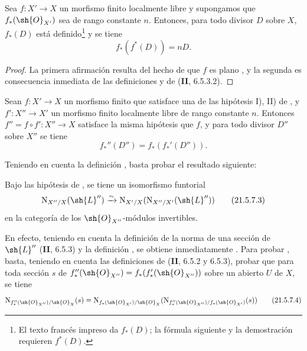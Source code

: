 \begin{proposition}[21.5.6]
\label{IV.21.5.6}
Sea $f:X'\to X$ un morfismo finito localmente libre y supongamos que $f_*(\sh{O}_{X'})$ sea de rango constante $n$.
Entonces, para todo divisor $D$ sobre $X$, $f_*(D)$ está definido\footnote{El texto francés impreso da $f_*(D)$; la fórmula siguiente y la demostración requieren $f^*(D)$.} y se tiene
\[
\label{IV.21.5.6.1}
  f_*(f^*(D))=nD.
  \tag{21.5.6.1}
\]
\end{proposition}

\begin{proof}
La primera afirmación resulta del hecho de que $f$ es plano , y la segunda es consecuencia inmediata de las definiciones y de (\textbf{II}, 6.5.3.2).
\end{proof}

\begin{proposition}[21.5.7]
\label{IV.21.5.7}
Sean $f:X'\to X$ un morfismo finito que satisface una de las hipótesis \textup{I), II)} de , y $f':X''\to X'$ un morfismo finito localmente libre de rango constante $n$.
Entonces $f''=f\circ f':X''\to X$ satisface la misma hipótesis que $f$, y para todo divisor $D''$ sobre $X''$ se tiene
\[
\label{IV.21.5.7.1}
  f_*''(D'')=f_*(f_*'(D'')).
  \tag{21.5.7.1}
\]
\end{proposition}

Teniendo en cuenta la definición , basta probar el resultado siguiente:

\begin{lemma}[21.5.7.2]
\label{IV.21.5.7.2}
Bajo las hipótesis de , se tiene un isomorfismo funtorial
\[
\label{IV.21.5.7.3}
  \mathrm{N}_{X''/X}(\sh{L}'')\xrightarrow{\sim}\mathrm{N}_{X'/X}(\mathrm{N}_{X''/X'}(\sh{L}''))
  \tag{21.5.7.3}
\]
en la categoría de los $\sh{O}_{X''}$-módulos invertibles.
\end{lemma}

En efecto, teniendo en cuenta la definición de la norma de una sección de $\sh{L}''$ (\textbf{II}, 6.5.3) y la definición , se obtiene inmediatamente .
Para probar , basta, teniendo en cuenta las definiciones de (\textbf{II}, 6.5.2 y 6.5.3), probar que para toda sección $s$ de $f_*''(\sh{O}_{X''})=f_*(f_*'(\sh{O}_{X''}))$ sobre un abierto $U$ de $X$, se tiene
\[
\label{IV.21.5.7.4}
  \mathrm{N}_{f_*''(\sh{O}_{X''})/\sh{O}_X}(s)=\mathrm{N}_{f_*(\sh{O}_{X'})/\sh{O}_X}(\mathrm{N}_{f_*''(\sh{O}_{X''})/f_*(\sh{O}_{X'})}(s))
  \tag{21.5.7.4}
\]

